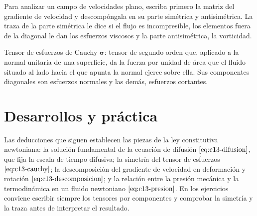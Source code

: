 \documentclass[10pt,openany]{book}
\begin{document}
\begin{tcolorbox}[title={Consejo}, studiumtip, breakable]

Para analizar un campo de velocidades plano, escriba primero la matriz del gradiente de velocidad y descompóngala en su parte simétrica y antisimétrica. La traza de la parte simétrica le dice si el flujo es incompresible, los elementos fuera de la diagonal le dan los esfuerzos viscosos y la parte antisimétrica, la vorticidad.
\end{tcolorbox}

\begin{tcolorbox}[title={Definición}, studiumdef, breakable]

Tensor de esfuerzos de Cauchy \(\boldsymbol{\sigma}\): tensor de segundo orden que, aplicado a la normal unitaria de una superficie, da la fuerza por unidad de área que el fluido situado al lado hacia el que apunta la normal ejerce sobre ella. Sus componentes diagonales son esfuerzos normales y las demás, esfuerzos cortantes.
\end{tcolorbox}



\section{Desarrollos y práctica}

Las deducciones que siguen establecen las piezas de la ley constitutiva newtoniana: la solución fundamental de la ecuación de difusión \(\eqref{eq:c13-difusion}\), que fija la escala de tiempo difusiva; la simetría del tensor de esfuerzos \(\eqref{eq:c13-cauchy}\); la descomposición del gradiente de velocidad en deformación y rotación \(\eqref{eq:c13-descomposicion}\); y la relación entre la presión mecánica y la termodinámica en un fluido newtoniano \(\eqref{eq:c13-presion}\). En los ejercicios conviene escribir siempre los tensores por componentes y comprobar la simetría y la traza antes de interpretar el resultado.
\end{document}
